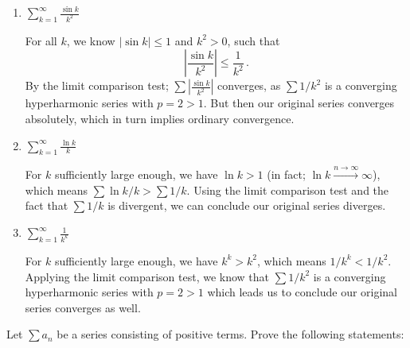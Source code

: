\documentclass[week=6]{homework}
\begin{document}
\begin{questions}
\begin{enumerate}[label=(\alph*)]
        	\addtocounter{enumi}{3}
        	\item $\displaystyle \sum_{k=1}^{\infty} \frac{\sin k}{k^2}$
        	
        	For all $k$, we know $|\sin k| \leq 1$ and $k^2 > 0$, such that
        	\[
	        	\left| \frac{\sin k}{k^2} \right| \leq \frac{1}{k^2}\,.
        	\]
        	By the limit comparison test; $\sum |\frac{\sin k}{k^2}|$ converges, as $\sum 1/k^2$ is a converging hyperharmonic series with $p = 2 > 1$. But then our original series converges absolutely, which in turn implies ordinary convergence.
        	
        	\item $\displaystyle \sum_{k=1}^{\infty} \frac{\ln k}{k}$
        	
        	For $k$ sufficiently large enough, we have $\ln k > 1$ (in fact; $\ln k \xrightarrow{n\to\infty} \infty$), which means $\sum \ln k / k > \sum 1 / k$. Using the limit comparison test and the fact that $\sum 1/k$ is divergent, we can conclude our original series diverges.
        	
        	\addtocounter{enumi}{1}
        	\item $\displaystyle \sum_{k=1}^{\infty} \frac{1}{k^k}$
        	
        	For $k$ sufficiently large enough, we have $k^k > k^2$, which means $1/k^k < 1/k^2$. Applying the limit comparison test, we know that $\sum 1 / k^2$ is a converging hyperharmonic series with $p = 2 > 1$ which leads us to conclude our original series converges as well.
        \end{enumerate}
	    
	    \question
	    Let $\sum a_n$ be a series consisting of positive terms. Prove the following statements:
	    \begin{parts}

\end{parts}
\end{questions}
\end{document}
